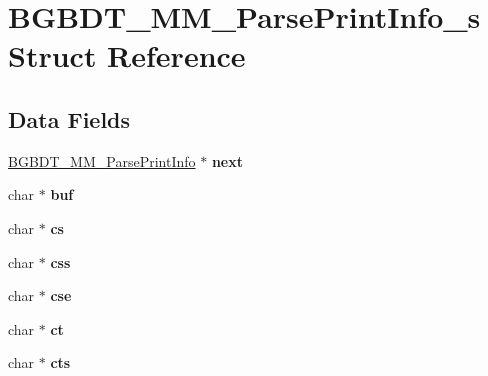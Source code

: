 \hypertarget{structBGBDT__MM__ParsePrintInfo__s}{\section{B\-G\-B\-D\-T\-\_\-\-M\-M\-\_\-\-Parse\-Print\-Info\-\_\-s Struct Reference}
\label{structBGBDT__MM__ParsePrintInfo__s}
}
\subsection*{Data Fields}
\begin{DoxyCompactItemize}
\item 
\hypertarget{structBGBDT__MM__ParsePrintInfo__s_aba1199cabb5f750c5d9d3aa98ce65593}{\hyperlink{structBGBDT__MM__ParsePrintInfo__s}{B\-G\-B\-D\-T\-\_\-\-M\-M\-\_\-\-Parse\-Print\-Info} $\ast$ {\bfseries next}}\label{structBGBDT__MM__ParsePrintInfo__s_aba1199cabb5f750c5d9d3aa98ce65593}

\item 
\hypertarget{structBGBDT__MM__ParsePrintInfo__s_afca32fe7c823b573ed1186cbc58c0a98}{char $\ast$ {\bfseries buf}}\label{structBGBDT__MM__ParsePrintInfo__s_afca32fe7c823b573ed1186cbc58c0a98}

\item 
\hypertarget{structBGBDT__MM__ParsePrintInfo__s_a1ee04e888846cdc6f6b9d981b5424d1e}{char $\ast$ {\bfseries cs}}\label{structBGBDT__MM__ParsePrintInfo__s_a1ee04e888846cdc6f6b9d981b5424d1e}

\item 
\hypertarget{structBGBDT__MM__ParsePrintInfo__s_a9337ab5b50aa9f34aefa302e22b20be0}{char $\ast$ {\bfseries css}}\label{structBGBDT__MM__ParsePrintInfo__s_a9337ab5b50aa9f34aefa302e22b20be0}

\item 
\hypertarget{structBGBDT__MM__ParsePrintInfo__s_aa63e7416bddc0c6eeff0ef18325ddc6c}{char $\ast$ {\bfseries cse}}\label{structBGBDT__MM__ParsePrintInfo__s_aa63e7416bddc0c6eeff0ef18325ddc6c}

\item 
\hypertarget{structBGBDT__MM__ParsePrintInfo__s_a6666b459d0c1af97dba1c7fdbec5ee1f}{char $\ast$ {\bfseries ct}}\label{structBGBDT__MM__ParsePrintInfo__s_a6666b459d0c1af97dba1c7fdbec5ee1f}

\item 
\hypertarget{structBGBDT__MM__ParsePrintInfo__s_a8d12eb3820122e2d838b896af9540f0d}{char $\ast$ {\bfseries cts}}\label{structBGBDT__MM__ParsePrintInfo__s_a8d12eb3820122e2d838b896af9540f0d}


\end{DoxyCompactItemize}
